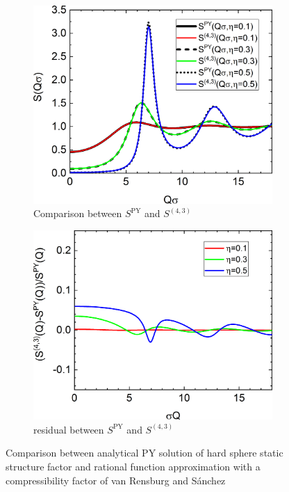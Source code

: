 \begin{figure}[htb]
\begin{subfigure}[b]{.48\textwidth}
   \centering
   \includegraphics[width=1\textwidth]{../images/structure_factor/HardSphere/SQ(4,3).png}
   \caption{Comparison between $S^\mathrm{PY}$ and $S^{(4,3)}$}
   \label{fig:SQ:43_1}
\end{subfigure}
\hfill
\begin{subfigure}[b]{.48\textwidth}
   \centering
   \includegraphics[width=1\textwidth]{../images/structure_factor/HardSphere/Res(4,3).png}
   \caption{residual between $S^\mathrm{PY}$ and $S^{(4,3)}$}
   \label{fig:SQ:43_2}
\end{subfigure}
\caption{Comparison between analytical PY solution of hard sphere static structure factor and rational function approximation with a compressibility factor of van Rensburg and S\'{a}nchez}
\label{fig:SQ:43}
\end{figure}

